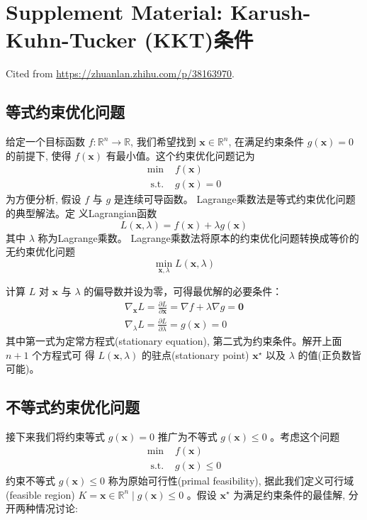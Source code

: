 \section{Supplement Material: Karush-Kuhn-Tucker (KKT)条件}

Cited from \url{https://zhuanlan.zhihu.com/p/38163970}.

\subsection{等式约束优化问题}

给定一个目标函数 $ f: \mathbb{R}^{n} \rightarrow \mathbb{R} $, 我们希望找到 $ \mathbf{x} \in \mathbb{R}^{n} $, 在满足约束条件 $ g(\mathbf{x})=0 $ 的前提下, 使得 $ f(\mathbf{x}) $ 有最小值。这个约束优化问题记为
$$
\begin{array}{ll}
\min & f(\mathbf{x}) \\
\text { s.t. } & g(\mathbf{x})=0
\end{array}
$$
为方便分析, 假设 $ f $ 与 $ g $ 是连续可导函数。 Lagrange乘数法是等式约束优化问题的典型解法。定 义Lagrangian函数
$$
L(\mathbf{x}, \lambda)=f(\mathbf{x})+\lambda g(\mathbf{x})
$$
其中 $ \lambda $ 称为Lagrange乘数。 Lagrange乘数法将原本的约束优化问题转换成等价的无约束优化问题
$$
\min _{\mathbf{x}, \lambda} L(\mathbf{x}, \lambda)
$$

计算 $ L $ 对 $ \mathbf{x} $ 与 $ \lambda $ 的偏导数并设为零，可得最优解的必要条件：
$$
\begin{array}{l}
\nabla_{\mathbf{x}} L=\frac{\partial L}{\partial \mathbf{x}}=\nabla f+\lambda \nabla g=\mathbf{0} \\
\nabla_{\lambda} L=\frac{\partial L}{\partial \lambda}=g(\mathbf{x})=0
\end{array}
$$
其中第一式为定常方程式(stationary equation), 第二式为约束条件。解开上面 $ n+1 $ 个方程式可 得 $ L(\mathbf{x}, \lambda) $ 的驻点(stationary point) $ \mathbf{x}^{\star} $ 以及 $ \lambda $ 的值(正负数皆可能)。

\subsection{不等式约束优化问题}

接下来我们将约束等式 $ g(\mathbf{x})=0 $ 推广为不等式 $ g(\mathbf{x}) \leq 0 $ 。考虑这个问题
$$
\begin{array}{ll}
\min & f(\mathbf{x}) \\
\text { s.t. } & g(\mathbf{x}) \leq 0
\end{array}
$$
约束不等式 $ g(\mathbf{x}) \leq 0 $ 称为原始可行性(primal feasibility), 据此我们定义可行域(feasible region) $ K=\mathbf{x} \in \mathbb{R}^{n} \mid g(\mathbf{x}) \leq 0 $ 。假设 $ \mathbf{x}^{\star} $ 为满足约束条件的最佳解, 分开两种情况讨论:

